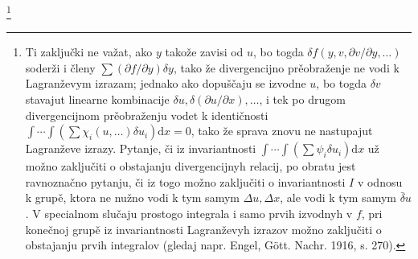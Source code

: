 \documentclass[11pt]{article}
\providecommand{\D}{\Delta}
\providecommand{\p}{\partial}
\providecommand{\dd}{\mathrm d}
\providecommand{\bd}{\bar{\delta}}
\begin{document}
\footnote{Ti zaključki ne važat, ako \(y\) takože zavisi od \(u\), bo togda \(\delta f(y,v,\p v/\p y,\ldots)\) soderži i členy \(\sum(\p f/\p y)\delta y\), tako že divergencijno prěobraženje ne vodi k Lagranževym izrazam; jednako ako dopuščaju se izvodne \(u\), bo togda \(\delta v\) stavajut linearne kombinacije \(\delta u,\delta(\p u/\p x),\ldots\), i tek po drugom divergencijnom prěobraženju vodet k identičnosti \(\int\!\cdots\!\int(\sum\chi_i(u,\ldots)\delta u_i)\dd x=0\), tako že sprava znovu ne nastupajut Lagranževe izrazy. Pytanje, či iz invariantnosti \(\int\!\cdots\!\int(\sum\psi_i\delta u_i)\dd x\) už možno zaključiti o obstajanju divergencijnyh relacij, po obratu jest ravnoznačno pytanju, či iz togo možno zaključiti o invariantnosti \(I\) v odnosu k grupě, ktora ne nužno vodi k tym samym \(\D u,\D x\), ale vodi k tym samym \(\bd u\). V specialnom slučaju prostogo integrala i samo prvih izvodnyh v \(f\), pri konečnoj grupě iz invariantnosti Lagranževyh izrazov možno zaključiti o obstajanju prvih integralov (gledaj napr. Engel, Gött. Nachr. 1916, s. 270).}
\end{document}
